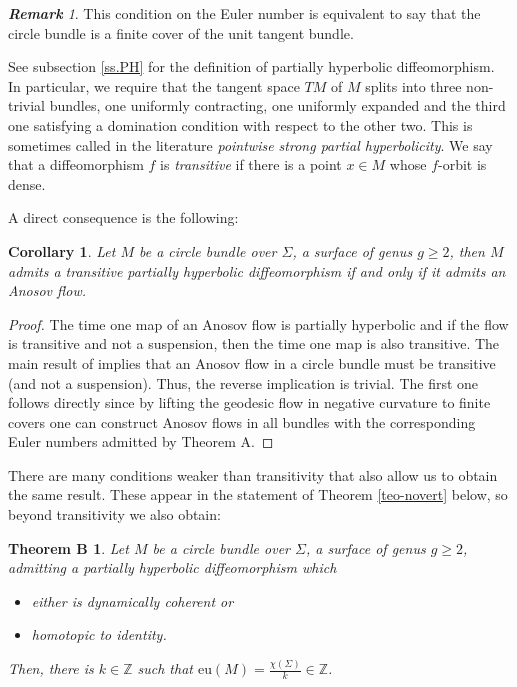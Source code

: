 \documentclass[11pt]{amsart} %
\numberwithin{equation}{section}
\newtheorem{cor}[equation]{Corollary}
\newtheorem*{teoB}{Theorem B}
\theoremstyle{remark}
\newtheorem*{remark} {\textbf{Remark}}
\begin{document}
\begin{remark} This condition on the Euler number is equivalent to say that the circle bundle is a finite cover of the unit tangent bundle. 
\end{remark}

See subsection \ref{ss.PH} for the definition of partially hyperbolic diffeomorphism. In particular, we require that the tangent space $TM$ of $M$ splits into three non-trivial bundles, one uniformly contracting, one uniformly expanded and the third one satisfying a domination condition with respect to the other two. This is sometimes called in the literature \emph{pointwise strong partial hyperbolicity}. We say that a diffeomorphism $f$ is \emph{transitive} if there is a point $x\in M$ whose $f$-orbit is dense. 

A direct consequence is the following:

\begin{cor}Let $M$ be a circle bundle over $\Sigma$, a surface of genus $g\geq 2$, then $M$ admits a transitive partially hyperbolic diffeomorphism if and only if it admits an Anosov flow. 
\end{cor}

\begin{proof} The time one map of an Anosov flow is partially hyperbolic and if the flow is transitive and not a suspension, then the time one map is also transitive. The main result of \cite{Ghys} implies that an Anosov flow in a circle bundle must be transitive (and not a suspension). Thus, the reverse implication is trivial. The first one follows directly since by lifting the geodesic flow in negative curvature to finite covers one can construct Anosov flows in all bundles with the corresponding Euler numbers admitted by Theorem A. 
\end{proof}

There are many conditions weaker than transitivity that also allow us to obtain the same result. These appear in the statement of Theorem \ref{teo-novert} below, so beyond transitivity we also obtain: 

\begin{teoB}
Let $M$ be a circle bundle over $\Sigma$, a surface of genus $g\geq 2$, admitting a partially hyperbolic diffeomorphism which
\begin{itemize}
\item either is \emph{dynamically coherent} or 
\item \emph{homotopic to identity}. 
\end{itemize} 
Then, there is $k \in \mathbb{Z}$ such that $\mathrm{eu}(M) = \frac{\chi(\Sigma)}{k} \in \mathbb{Z}$. 
\end{teoB}
\end{document}
